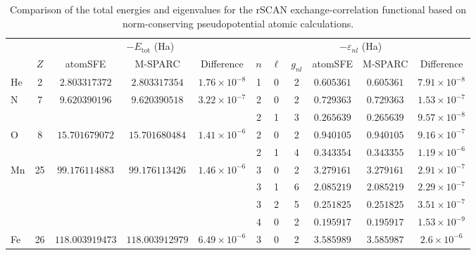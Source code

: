 \begin{table}[!htbp]
    \centering
    \footnotesize
    \setlength{\tabcolsep}{3pt}
    \renewcommand{\arraystretch}{0.9}
    \caption{Comparison of the total energies and eigenvalues for the rSCAN exchange-correlation functional based on norm-conserving pseudopotential atomic calculations.}
    \label{tab:pseudo-rscan-eigs}
    \begin{tabular}{@{}l c ccc ccc ccc@{}}
        \toprule
        & & \multicolumn{3}{c}{$-E_{\mathrm{tot}}$ (Ha)} & \multicolumn{6}{c}{$-\varepsilon_{nl}$ (Ha)} \\
        \cmidrule(lr){3-5} \cmidrule(lr){6-11}
         & $Z$ & atomSFE & M-SPARC & Difference & $n$ & $\ell$ & $g_{nl}$ & atomSFE & M-SPARC & Difference \\
        \midrule
        \multirow[t]{1}{*}{He} & \multirow[t]{1}{*}{2} & \multirow[t]{1}{*}{$2.803317372$} & \multirow[t]{1}{*}{$2.803317354$} & \multirow[t]{1}{*}{$1.76 \times 10^{-8}$} & 1 & 0 & 2 & $0.605361$ & $0.605361$ & $7.91 \times 10^{-8}$ \\
        \multirow[t]{2}{*}{N} & \multirow[t]{2}{*}{7} & \multirow[t]{2}{*}{$9.620390196$} & \multirow[t]{2}{*}{$9.620390518$} & \multirow[t]{2}{*}{$3.22 \times 10^{-7}$} & 2 & 0 & 2 & $0.729363$ & $0.729363$ & $1.53 \times 10^{-7}$ \\
         &  &  &  &  & 2 & 1 & 3 & $0.265639$ & $0.265639$ & $9.57 \times 10^{-8}$ \\
        \multirow[t]{2}{*}{O} & \multirow[t]{2}{*}{8} & \multirow[t]{2}{*}{$15.701679072$} & \multirow[t]{2}{*}{$15.701680484$} & \multirow[t]{2}{*}{$1.41 \times 10^{-6}$} & 2 & 0 & 2 & $0.940105$ & $0.940105$ & $9.16 \times 10^{-7}$ \\
         &  &  &  &  & 2 & 1 & 4 & $0.343354$ & $0.343355$ & $1.19 \times 10^{-6}$ \\
        \multirow[t]{4}{*}{Mn} & \multirow[t]{4}{*}{25} & \multirow[t]{4}{*}{$99.176114883$} & \multirow[t]{4}{*}{$99.176113426$} & \multirow[t]{4}{*}{$1.46 \times 10^{-6}$} & 3 & 0 & 2 & $3.279161$ & $3.279161$ & $2.91 \times 10^{-7}$ \\
         &  &  &  &  & 3 & 1 & 6 & $2.085219$ & $2.085219$ & $2.29 \times 10^{-7}$ \\
         &  &  &  &  & 3 & 2 & 5 & $0.251825$ & $0.251825$ & $3.51 \times 10^{-7}$ \\
         &  &  &  &  & 4 & 0 & 2 & $0.195917$ & $0.195917$ & $1.53 \times 10^{-9}$ \\
        \multirow[t]{4}{*}{Fe} & \multirow[t]{4}{*}{26} & \multirow[t]{4}{*}{$118.003919473$} & \multirow[t]{4}{*}{$118.003912979$} & \multirow[t]{4}{*}{$6.49 \times 10^{-6}$} & 3 & 0 & 2 & $3.585989$ & $3.585987$ & $2.6 \times 10^{-6}$ \\

\end{tabular}
\end{table}
